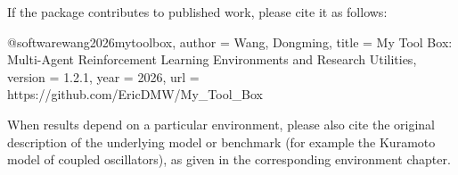 If the package contributes to published work, please cite it as follows:

\begin{textcode}
@software{wang2026mytoolbox,
  author  = {Wang, Dongming},
  title   = {My Tool Box: Multi-Agent Reinforcement Learning
             Environments and Research Utilities},
  version = {1.2.1},
  year    = {2026},
  url     = {https://github.com/EricDMW/My_Tool_Box}
}
\end{textcode}

When results depend on a particular environment, please also cite the
original description of the underlying model or benchmark (for example the
Kuramoto model of coupled oscillators), as given in the corresponding
environment chapter.

\par\endgroup
